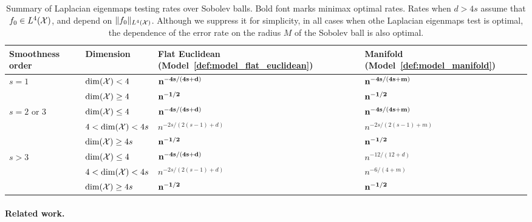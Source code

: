 \begin{table}
	\begin{center}
		\begin{tabular}{p{} p{} | p{} p{} }
			Smoothness order & Dimension & Flat Euclidean (Model~\ref{def:model_flat_euclidean}) & Manifold (Model~\ref{def:model_manifold}) \\
			\hline
			\multirow{2}{*}{$s = 1$} & $\dim(\mathcal{X}) < 4$ & ${\bf n^{-4s/(4s + d)}}$ & ${\bf n^{-4s/(4s + m)}}$ \\
			& $\dim(\mathcal{X}) \geq 4$ & ${\bf n^{-1/2}}$ & ${\bf n^{-1/2}}$ \\
			\hline
			\multirow{3}{*}{$s = 2$ or $3$} & $\dim(\mathcal{X}) \leq 4$  & ${\bf n^{-4s/(4s + d)}}$ & ${\bf n^{-4s/(4s + m)}}$ \\
			& $4 <\dim(\mathcal{X}) < 4s$  & $n^{-2s/(2(s - 1) + d)}$ & $n^{-2s/(2(s - 1) + m)}$\\
			& $\dim(\mathcal{X}) \geq 4s$ & ${\bf n^{-1/2}}$ & ${\bf n^{-1/2}}$ \\
			\hline
			\multirow{3}{*}{$s > 3$} & $\dim(\mathcal{X}) \leq 4$ & ${\bf n^{-4s/(4s + d)}}$ & $n^{-12/(12 + d)}$ \\
			& $4 < \dim(\mathcal{X}) < 4s$ & $n^{-2s/(2(s - 1) + d)}$ & $n^{-6/(4 + m)}$ \\
			& $\dim(\mathcal{X}) \geq 4s$ & ${\bf n^{-1/2}}$ & ${\bf n^{-1/2}}$ \\
		\end{tabular}
	\end{center}
	\caption{Summary of Laplacian eigenmaps testing rates over Sobolev balls. Bold font marks minimax optimal rates. Rates when $d > 4s$ assume that $f_0 \in L^4(\mathcal{X})$, and depend on $\|f_0\|_{L^4(\mathcal{X})}$. Although we suppress it for simplicity, in all cases when othe Laplacian eigenmaps test is optimal, the dependence of the error rate on the radius $M$ of the Sobolev ball is also optimal.}
	\label{tbl:testing_rates}
\end{table}

\paragraph{Related work.}


